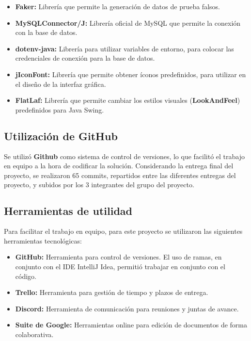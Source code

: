 \begin{itemize}
    \item \textbf{Faker:} Librería que permite la generación de datos de prueba falsos.
    \item \textbf{MySQLConnector/J:} Librería oficial de MySQL que permite la conexión con la base de datos.
    \item \textbf{dotenv-java:} Librería para utilizar variables de entorno, para colocar las credenciales de conexión para la base de datos.
    \item \textbf{jIconFont:} Librería que permite obtener íconos predefinidos, para utilizar en el diseño de la interfaz gráfica.
    \item \textbf{FlatLaf:} Librería que permite cambiar los estilos visuales (\textbf{LookAndFeel}) predefinidos para Java Swing.
\end{itemize}

\subsection{Utilización de GitHub}
\label{cons:utilizaciongithub}
Se utilizó \faGithub \textbf{Github} como sistema de control de versiones, lo que facilitó el trabajo en equipo a la hora de codificar la solución. Considerando la entrega final del proyecto, se realizaron 65 commits, repartidos entre las diferentes entregas del proyecto, y subidos por los 3 integrantes del grupo del proyecto.

\subsection{Herramientas de utilidad}
\label{subsec:herramientasutilidad}
Para facilitar el trabajo en equipo, para este proyecto se utilizaron las siguientes herramientas tecnológicas:

\begin{itemize}
    \item \faGithub \textbf{GitHub:} Herramienta para control de versiones. El uso de ramas, en conjunto con el IDE IntelliJ Idea, permitió trabajar en conjunto con el código.
    \item \faTrello \textbf{Trello:} Herramienta para gestión de tiempo y plazos de entrega.
    \item \faDiscord \textbf{Discord:} Herramienta de comunicación para reuniones y juntas de avance.
    \item \faGoogle \textbf{Suite de Google:} Herramientas online para edición de documentos de forma colaborativa.
\end{itemize}
